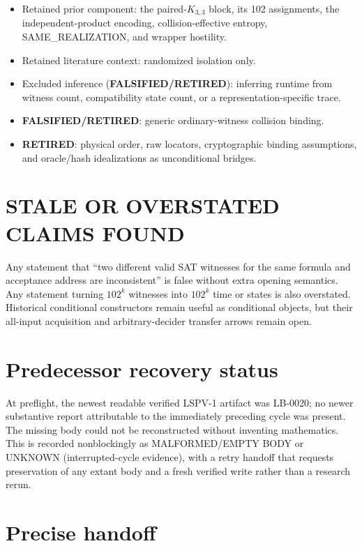 \documentclass[11pt]{article}
\newcommand{\status}[1]{\textbf{#1}}
\begin{document}
\begin{itemize}
\item Retained prior component: the paired-$K_{3,3}$ block, its 102 assignments, the
independent-product encoding, collision-effective entropy, SAME\_REALIZATION,
and wrapper hostility.
\item Retained literature context: randomized isolation only.
\item Excluded inference (\status{FALSIFIED/RETIRED}): inferring runtime from witness count, compatibility
state count, or a representation-specific trace.
\item \status{FALSIFIED/RETIRED}: generic ordinary-witness collision binding.
\item \status{RETIRED}: physical order, raw locators, cryptographic binding
assumptions, and oracle/hash idealizations as unconditional bridges.
\end{itemize}

\section*{STALE OR OVERSTATED CLAIMS FOUND}

Any statement that ``two different valid SAT witnesses for the same formula
and acceptance address are inconsistent'' is false without extra opening
semantics.  Any statement turning $102^k$ witnesses into $102^k$ time or
states is also overstated.  Historical conditional constructors remain useful
as conditional objects, but their all-input acquisition and arbitrary-decider
transfer arrows remain open.

\section*{Predecessor recovery status}

At preflight, the newest readable verified LSPV-1 artifact was LB-0020; no
newer substantive report attributable to the immediately preceding cycle was
present.  The missing body could not be reconstructed without inventing
mathematics.  This is recorded nonblockingly as MALFORMED/EMPTY BODY or UNKNOWN
(interrupted-cycle evidence), with a retry handoff that requests preservation
of any extant body and a fresh verified write rather than a research rerun.

\section*{Precise handoff}
\end{document}
